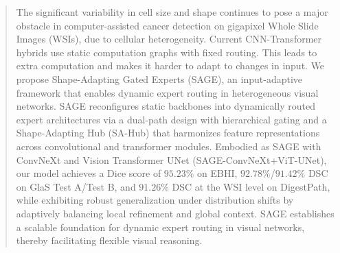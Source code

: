 \begin{abstract}
The significant variability in cell size and shape continues to pose a major obstacle in computer-assisted cancer detection on gigapixel Whole Slide Images (WSIs), due to cellular heterogeneity. Current CNN-Transformer hybrids use static computation graphs with fixed routing. This leads to extra computation and makes it harder to adapt to changes in input. We propose Shape-Adapting Gated Experts (SAGE), an input-adaptive framework that enables dynamic expert routing in heterogeneous visual networks. SAGE reconfigures static backbones into dynamically routed expert architectures via a dual-path design with hierarchical gating and a Shape-Adapting Hub (SA-Hub) that harmonizes feature representations across convolutional and transformer modules. Embodied as SAGE with ConvNeXt and Vision Transformer UNet (SAGE-ConvNeXt+ViT-UNet), our model achieves a Dice score of $95.23\%$ on EBHI, $92.78\%$/$91.42\%$ DSC on GlaS Test A/Test B, and $91.26\%$ DSC at the WSI level on DigestPath, while exhibiting robust generalization under distribution shifts by adaptively balancing local refinement and global context. SAGE establishes a scalable foundation for dynamic expert routing in visual networks, thereby facilitating flexible visual reasoning.
\end{abstract}